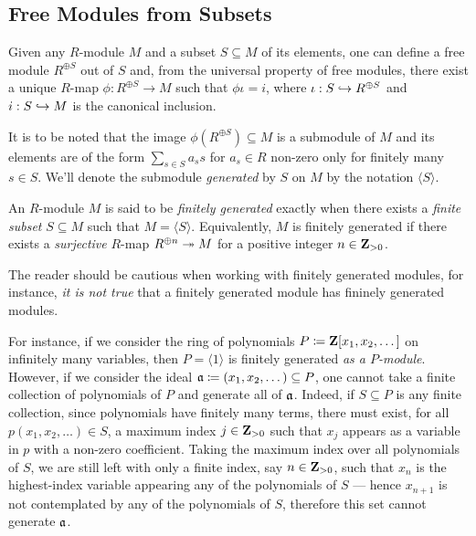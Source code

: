\subsection{Free Modules from Subsets}

Given any \(R\)-module \(M\) and a subset \(S \subseteq M\) of its elements, one
can define a free module \(R^{\oplus S}\) out of \(S\) and, from the universal
property of free modules, there exist a unique \(R\)-map \(\phi: R^{\oplus S}
\to M\) such that \(\phi \iota = i\), where \(\iota: S \hookrightarrow R^{\oplus S}\) and
\(i: S \hookrightarrow M\) is the canonical inclusion.

It is to be noted that the image \(\phi(R^{\oplus S}) \subseteq M\) is a
submodule of \(M\) and its elements are of the form \(\sum_{s \in S} a_s s\) for
\(a_s \in R\) non-zero only for finitely many \(s \in S\). We'll denote the
submodule \emph{generated} by \(S\) on \(M\) by the notation
\(\langle S \rangle\).


\begin{definition}
\label{def:finitely-generated-module}
An \(R\)-module \(M\) is said to be \emph{finitely generated} exactly when there
exists a \emph{finite subset} \(S \subseteq M\) such that
\(M = \langle S \rangle\). Equivalently, \(M\) is finitely generated if there
exists a \emph{surjective} \(R\)-map \(R^{\oplus n} \twoheadrightarrow M\) for a positive
integer \(n \in \mathbf{Z}_{>0}\).
\end{definition}

\begin{remark}[Submodules]
\label{rem:submodules-finitely-generated}
The reader should be cautious when working with finitely generated modules, for
instance, \emph{it is not true} that a finitely generated module has fininely
generated modules.

For instance, if we consider the ring of polynomials
\(P \coloneq \mathbf{Z}[x_1, x_2, \dots]\) on infinitely many variables, then
\(P = \langle 1 \rangle\) is finitely generated \emph{as a
  \(P\)-module}. However, if we consider the ideal
\(\mathfrak{a} \coloneq (x_1, x_2, \dots) \subseteq P\), one cannot take a finite
collection of polynomials of \(P\) and generate all of \(\mathfrak{a}\). Indeed, if
\(S \subseteq P\) is any finite collection, since polynomials have finitely many
terms, there must exist, for all \(p(x_1, x_2, \dots) \in S\), a maximum index
\(j \in \mathbf{Z}_{>0}\) such that \(x_j\) appears as a variable in \(p\) with a
non-zero coefficient. Taking the maximum index over all polynomials of \(S\), we
are still left with only a finite index, say \(n \in \mathbf{Z}_{>0}\), such that
\(x_n\) is the highest-index variable appearing any of the polynomials of \(S\)
--- hence \(x_{n+1}\) is not contemplated by any of the polynomials of \(S\),
therefore this set cannot generate \(\mathfrak{a}\).
\end{remark}

